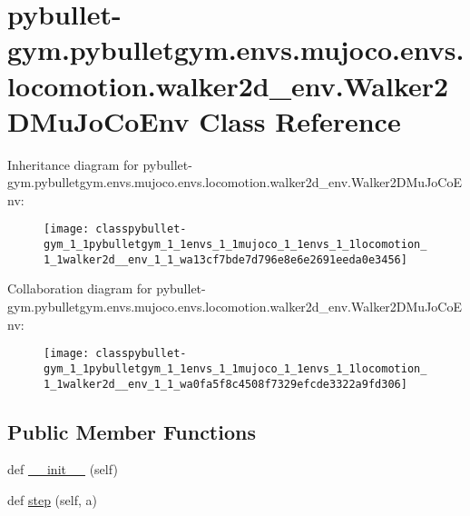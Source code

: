 \hypertarget{classpybullet-gym_1_1pybulletgym_1_1envs_1_1mujoco_1_1envs_1_1locomotion_1_1walker2d__env_1_1_walker2_d_mu_jo_co_env}{}\section{pybullet-\/gym.pybulletgym.\+envs.\+mujoco.\+envs.\+locomotion.\+walker2d\+\_\+env.\+Walker2\+D\+Mu\+Jo\+Co\+Env Class Reference}
\label{classpybullet-gym_1_1pybulletgym_1_1envs_1_1mujoco_1_1envs_1_1locomotion_1_1walker2d__env_1_1_walker2_d_mu_jo_co_env}


Inheritance diagram for pybullet-\/gym.pybulletgym.\+envs.\+mujoco.\+envs.\+locomotion.\+walker2d\+\_\+env.\+Walker2\+D\+Mu\+Jo\+Co\+Env\+:
\nopagebreak
\begin{figure}[H]
\begin{center}
\leavevmode
\texttt{[image: classpybullet-gym\_1\_1pybulletgym\_1\_1envs\_1\_1mujoco\_1\_1envs\_1\_1locomotion\_1\_1walker2d\_\_env\_1\_1\_wa13cf7bde7d796e8e6e2691eeda0e3456]}
\end{center}
\end{figure}


Collaboration diagram for pybullet-\/gym.pybulletgym.\+envs.\+mujoco.\+envs.\+locomotion.\+walker2d\+\_\+env.\+Walker2\+D\+Mu\+Jo\+Co\+Env\+:
\nopagebreak
\begin{figure}[H]
\begin{center}
\leavevmode
\texttt{[image: classpybullet-gym\_1\_1pybulletgym\_1\_1envs\_1\_1mujoco\_1\_1envs\_1\_1locomotion\_1\_1walker2d\_\_env\_1\_1\_wa0fa5f8c4508f7329efcde3322a9fd306]}
\end{center}
\end{figure}
\subsection*{Public Member Functions}
\begin{DoxyCompactItemize}
\item 
def \hyperlink{classpybullet-gym_1_1pybulletgym_1_1envs_1_1mujoco_1_1envs_1_1locomotion_1_1walker2d__env_1_1_walker2_d_mu_jo_co_env_a80fb49c9690e27cc2a6d346705af412c}{\+\_\+\+\_\+init\+\_\+\+\_\+} (self)
\item 
def \hyperlink{classpybullet-gym_1_1pybulletgym_1_1envs_1_1mujoco_1_1envs_1_1locomotion_1_1walker2d__env_1_1_walker2_d_mu_jo_co_env_ac5645b93fba8083327ff4494fa4222eb}{step} (self, a)
\end{DoxyCompactItemize}
